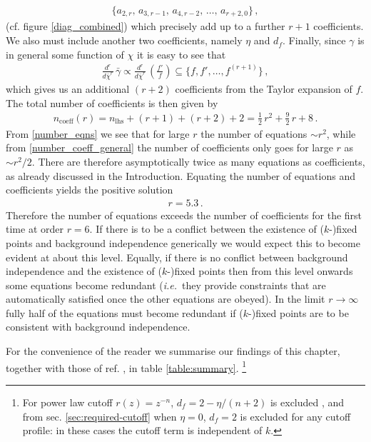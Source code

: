 \documentclass[11pt]{book} %
\newcommand\ie{\textit{i.e.}\ }
\numberwithin{equation}{chapter}
\begin{document}
\begin{align}
  \bigg\lbrace
  a_{2,r},\, a_{3,r-1},\, a_{4,r-2},\, \dots,\, a_{r+2,0}
  \bigg\rbrace \,,
\end{align}
(cf. figure \ref{diag_combined}) which precisely add up to a further $r+1$ coefficients.
We also must include another two coefficients, namely $\eta$ and $d_f$.
Finally, since $\gamma$ is in general some function of $\chi$ it is easy to see that
\begin{align}
  \frac{d^r}{d \bar\chi^r} \, \bar{\gamma} \propto \frac{d^r}{d \bar\chi^r} \, \left( \frac{f'}{f}\right) \subseteq
  \bigg\lbrace f, f', \dots, f^{(r+1)}   \bigg\rbrace \,,
\end{align}
which gives us an additional $(r+2)$ coefficients from the Taylor expansion of $f$.
The total number of coefficients is then given by
\begin{align}
  \label{number_coeff_general}
  n_{\text{coeff}}(r) = n_{\text{lhs}} + (r+1) + (r+2) + 2  = \frac{1}{2} \, r^2 + \frac{9}{2} \, r + 8 \,.
\end{align}
From \eqref{number_eqns} we see that for large $r$ the number of equations $\sim r^2$,
while from \eqref{number_coeff_general} the number of coefficients only goes for large $r$ as $\sim r^2/2$.
There are therefore asymptotically twice as many equations as coefficients,
as already discussed in the Introduction.
Equating the number of equations and coefficients yields the positive solution
\begin{align}
  r = 5.3 \,.
\end{align}
Therefore the number of equations exceeds the number of coefficients for the first time at order $r=6$.
If there is to be a conflict between the existence of ($k$-)fixed points and background independence
generically we would expect this to become evident at about this level.
Equally, if there is no conflict between background independence and the existence of ($k$-)fixed points
then from this level onwards some equations become redundant
(\ie they provide constraints that are automatically satisfied once the other equations are obeyed).
In the limit $r\to\infty$ fully half of the equations must become redundant if ($k$-)fixed points are
to be consistent with background independence.

For the convenience of the reader we summarise our findings of this chapter,
together with those of ref. \cite{Dietz:2015owa}, in table \ref{table:summary}.%
\footnote{
  For power law cutoff  $r(z)=z^{-n}$, $d_f = 2-\eta/(n+2)$ is excluded \cite{Dietz:2015owa},
  and from sec. \ref{sec:required-cutoff} when $\eta=0$,  $d_f=2$ is excluded for any cutoff profile:
  in these cases the cutoff term is independent of $k$.
}
\end{document}
